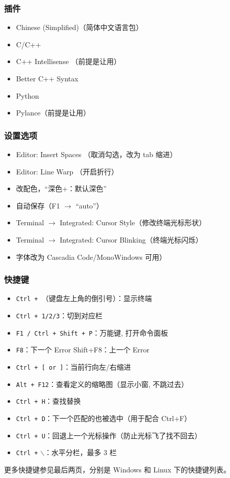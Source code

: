 \subsubsection{插件}

\begin{itemize}
	\item Chinese (Simplified)（简体中文语言包）
	\item C/C++
	\item C++ Intellisense （前提是让用）
	\item Better C++ Syntax
	\item Python
	\item Pylance（前提是让用）
\end{itemize}

\subsubsection{设置选项}

\begin{itemize}
	\item Editor: Insert Spaces （取消勾选，改为 tab 缩进）
	\item Editor: Line Warp （开启折行）
	\item 改配色，“深色+：默认深色”
	\item 自动保存（F1 $\rightarrow$ ``auto''）
	\item Terminal $\to$ Integrated: Cursor Style（修改终端光标形状）
	\item Terminal $\to$ Integrated: Cursor Blinking（终端光标闪烁）
	\item 字体改为 Cascadia Code/MonoWindows 可用）
\end{itemize}

\subsubsection{快捷键}

\begin{itemize}
	\item \texttt{Ctrl + }（键盘左上角的倒引号）：显示终端
	\item \texttt{Ctrl + 1/2/3}：切到对应栏
	\item \texttt{F1 / Ctrl + Shift + P}：万能键, 打开命令面板
	\item \texttt{F8}：下一个 Error \quad Shift+F8：上一个 Error
	\item \texttt{Ctrl + [ or ]}：当前行向左/右缩进
	\item \texttt{Alt + F12}：查看定义的缩略图（显示小窗, 不跳过去）
	\item \texttt{Ctrl + H}：查找替换
	\item \texttt{Ctrl + D}：下一个匹配的也被选中（用于配合 Ctrl+F）
	\item \texttt{Ctrl + U}：回退上一个光标操作（防止光标飞了找不回去）
	\item \texttt{Ctrl +} $\backslash$：水平分栏，最多 3 栏
\end{itemize}

更多快捷键参见最后两页，分别是 Windows 和 Linux 下的快捷键列表。
